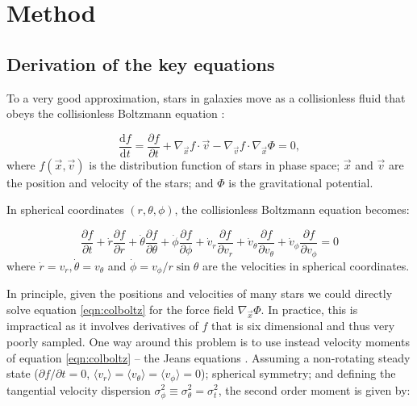 \section{Method}\label{sec:method}

\subsection{Derivation of the key equations}

To a very good approximation, stars in galaxies move as a collisionless fluid
that obeys the collisionless Boltzmann equation
\citep[e.g.][]{BinneyTremaine2008}:

\begin{equation}
\frac{\text{d}f}{\text{d}t} = \frac{\partial f}{\partial t} + \nabla_{\vec{x}} f\cdot\vec{v} - \nabla_{\vec{v}} f\cdot\nabla_{\vec{x}}\Phi = 0,
\end{equation}
where $f(\vec{x},\vec{v})$ is the distribution function of stars in phase space;
$\vec{x}$ and $\vec{v}$ are the position and velocity of the stars; and $\Phi$
is the gravitational potential.

In spherical coordinates $(r, \theta, \phi)$, the collisionless Boltzmann
equation becomes:

\begin{equation}
    \frac{\partial f}{\partial t} + \dot{r}\frac{\partial f}{\partial r} + \dot{\theta}\frac{\partial f}{\partial \theta} + \dot{\phi}\frac{\partial f}{\partial \phi} + \dot{v}_r\frac{\partial f}{\partial v_r}+\dot{v}_\theta\frac{\partial f}{\partial v_\theta} +\dot{v}_\phi\frac{\partial f}{\partial v_\phi} = 0
\label{eqn:colboltz}
\end{equation}
where $\dot{r} = v_r, \dot{\theta} = v_\theta$ and $\dot{\phi} = v_\phi / r
\sin\theta$ are the velocities in spherical coordinates.

In principle, given the positions and velocities of many stars we could directly
solve equation \ref{eqn:colboltz} for the force field $\nabla_{\vec{x}}\Phi$. In
practice, this is impractical as it involves derivatives of $f$ that is six
dimensional and thus very poorly sampled. One way around this problem is to use
instead velocity moments of equation \ref{eqn:colboltz} -- the Jeans equations
\citep[e.g.][]{BinneyTremaine2008}. Assuming a non-rotating steady state
($\partial f/\partial t=0$, $\langle {v}_r \rangle = \langle {v}_\theta \rangle
= \langle {v}_\phi \rangle =0$); spherical symmetry; and defining the tangential
velocity dispersion $\sigma_\phi^2 \equiv \sigma_\theta^2=\sigma_t^2$, the
second order moment is given by:

